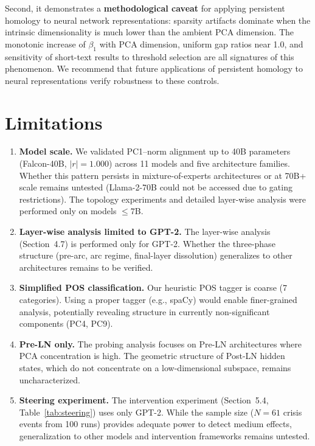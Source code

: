 \documentclass[11pt,a4paper]{article}
\begin{document}
Second, it demonstrates a \textbf{methodological caveat} for applying persistent homology to neural network representations: sparsity artifacts dominate when the intrinsic dimensionality is much lower than the ambient PCA dimension. The monotonic increase of $\beta_1$ with PCA dimension, uniform gap ratios near 1.0, and sensitivity of short-text results to threshold selection are all signatures of this phenomenon. We recommend that future applications of persistent homology to neural representations verify robustness to these controls.

\section{Limitations}

\begin{enumerate}
    \item \textbf{Model scale.} We validated PC1--norm alignment up to 40B parameters (Falcon-40B, $|r| = 1.000$) across 11 models and five architecture families. Whether this pattern persists in mixture-of-experts architectures or at 70B+ scale remains untested (Llama-2-70B could not be accessed due to gating restrictions). The topology experiments and detailed layer-wise analysis were performed only on models $\leq 7$B.

    \item \textbf{Layer-wise analysis limited to GPT-2.} The layer-wise analysis (Section~4.7) is performed only for GPT-2. Whether the three-phase structure (pre-arc, arc regime, final-layer dissolution) generalizes to other architectures remains to be verified.

    \item \textbf{Simplified POS classification.} Our heuristic POS tagger is coarse (7 categories). Using a proper tagger (e.g., spaCy) would enable finer-grained analysis, potentially revealing structure in currently non-significant components (PC4, PC9).

    \item \textbf{Pre-LN only.} The probing analysis focuses on Pre-LN architectures where PCA concentration is high. The geometric structure of Post-LN hidden states, which do not concentrate on a low-dimensional subspace, remains uncharacterized.

    \item \textbf{Steering experiment.} The intervention experiment (Section~5.4, Table~\ref{tab:steering}) uses only GPT-2. While the sample size ($N = 61$ crisis events from 100 runs) provides adequate power to detect medium effects, generalization to other models and intervention frameworks remains untested.
\end{enumerate}
\end{document}
